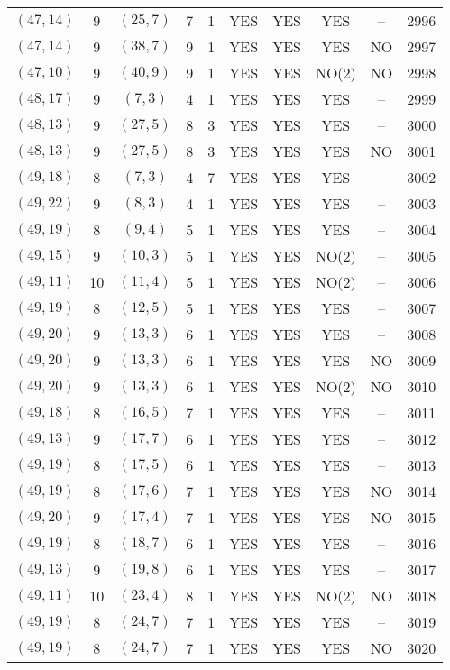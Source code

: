 \begin{longtable}{|c|c|c|c|c|c|c|c|c|c|}
$(47, 14)$ & 9 & $(25, 7)$ & 7 & 1 & YES & YES & YES & -- & 2996\\
$(47, 14)$ & 9 & $(38, 7)$ & 9 & 1 & YES & YES & YES & NO & 2997\\
$(47, 10)$ & 9 & $(40, 9)$ & 9 & 1 & YES & YES & NO(2) & NO & 2998\\
$(48, 17)$ & 9 & $(7, 3)$ & 4 & 1 & YES & YES & YES & -- & 2999\\
$(48, 13)$ & 9 & $(27, 5)$ & 8 & 3 & YES & YES & YES & -- & 3000\\
$(48, 13)$ & 9 & $(27, 5)$ & 8 & 3 & YES & YES & YES & NO & 3001\\
$(49, 18)$ & 8 & $(7, 3)$ & 4 & 7 & YES & YES & YES & -- & 3002\\
$(49, 22)$ & 9 & $(8, 3)$ & 4 & 1 & YES & YES & YES & -- & 3003\\
$(49, 19)$ & 8 & $(9, 4)$ & 5 & 1 & YES & YES & YES & -- & 3004\\
$(49, 15)$ & 9 & $(10, 3)$ & 5 & 1 & YES & YES & NO(2) & -- & 3005\\
$(49, 11)$ & 10 & $(11, 4)$ & 5 & 1 & YES & YES & NO(2) & -- & 3006\\
$(49, 19)$ & 8 & $(12, 5)$ & 5 & 1 & YES & YES & YES & -- & 3007\\
$(49, 20)$ & 9 & $(13, 3)$ & 6 & 1 & YES & YES & YES & -- & 3008\\
$(49, 20)$ & 9 & $(13, 3)$ & 6 & 1 & YES & YES & YES & NO & 3009\\
$(49, 20)$ & 9 & $(13, 3)$ & 6 & 1 & YES & YES & NO(2) & NO & 3010\\
$(49, 18)$ & 8 & $(16, 5)$ & 7 & 1 & YES & YES & YES & -- & 3011\\
$(49, 13)$ & 9 & $(17, 7)$ & 6 & 1 & YES & YES & YES & -- & 3012\\
$(49, 19)$ & 8 & $(17, 5)$ & 6 & 1 & YES & YES & YES & -- & 3013\\
$(49, 19)$ & 8 & $(17, 6)$ & 7 & 1 & YES & YES & YES & NO & 3014\\
$(49, 20)$ & 9 & $(17, 4)$ & 7 & 1 & YES & YES & YES & NO & 3015\\
$(49, 19)$ & 8 & $(18, 7)$ & 6 & 1 & YES & YES & YES & -- & 3016\\
$(49, 13)$ & 9 & $(19, 8)$ & 6 & 1 & YES & YES & YES & -- & 3017\\
$(49, 11)$ & 10 & $(23, 4)$ & 8 & 1 & YES & YES & NO(2) & NO & 3018\\
$(49, 19)$ & 8 & $(24, 7)$ & 7 & 1 & YES & YES & YES & -- & 3019\\
$(49, 19)$ & 8 & $(24, 7)$ & 7 & 1 & YES & YES & YES & NO & 3020\\

\end{longtable}
